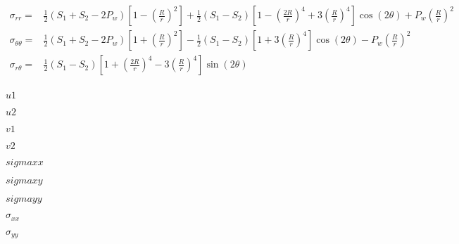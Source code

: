 \documentclass[onecolumn,11pt]{report}
\def\lthtmlcheckvsize{\ifdim\ht\sizebox<\vsize 
  \ifdim\wd\sizebox<\hsize\expandafter\hfill\fi \expandafter\vfill
  \else\expandafter\vss\fi}%
\begin{document}
{\newpage\clearpage
{}%
\begin{equation*}\begin{aligned}
\sigma_{rr} = & \frac{1}{2}(S_1 + S_2 - 2P_w)
\left[ 1 - \left( \frac{R}{r} \right)^2 \right] +
\frac{1}{2}(S_1 - S_2)\left[
1 - \left( \frac{2R}{r} \right)^4 + 3\left( \frac{R}{r} \right)^4
\right] \cos(2\theta)
+ P_w\left( \frac{R}{r} \right)^2 \\
\sigma_{\theta \theta} = & \frac{1}{2}(S_1 + S_2 - 2P_w)
\left[ 1 + \left( \frac{R}{r} \right)^2 \right] -
\frac{1}{2}(S_1 - S_2)\left[
1 + 3\left( \frac{R}{r} \right)^4
\right] \cos(2\theta)
- P_w\left( \frac{R}{r} \right)^2 \\
\sigma_{r \theta} = &
\frac{1}{2}(S_1 - S_2)\left[
1 + \left( \frac{2R}{r} \right)^4 - 3\left( \frac{R}{r} \right)^4
\right]\sin(2\theta) \\
\end{aligned}\end{equation*}%
\lthtmldisplayZ
\lthtmlcheckvsize\clearpage}

{\newpage\clearpage
{}%
$ u1$%
\lthtmlindisplaymathZ
\lthtmlcheckvsize\clearpage}

{\newpage\clearpage
{}%
$ u2$%
\lthtmlindisplaymathZ
\lthtmlcheckvsize\clearpage}

{\newpage\clearpage
{}%
$ v1$%
\lthtmlindisplaymathZ
\lthtmlcheckvsize\clearpage}

{\newpage\clearpage
{}%
$ v2$%
\lthtmlindisplaymathZ
\lthtmlcheckvsize\clearpage}

{\newpage\clearpage
{}%
$ sigmaxx$%
\lthtmlindisplaymathZ
\lthtmlcheckvsize\clearpage}

{\newpage\clearpage
{}%
$ sigmaxy$%
\lthtmlindisplaymathZ
\lthtmlcheckvsize\clearpage}

{\newpage\clearpage
{}%
$ sigmayy$%
\lthtmlindisplaymathZ
\lthtmlcheckvsize\clearpage}

{\newpage\clearpage
{}%
$ \sigma_{xx}$%
\lthtmlindisplaymathZ
\lthtmlcheckvsize\clearpage}

{\newpage\clearpage
{}%
$ \sigma_{yy}$%
\lthtmlindisplaymathZ
\lthtmlcheckvsize\clearpage}
\end{document}
